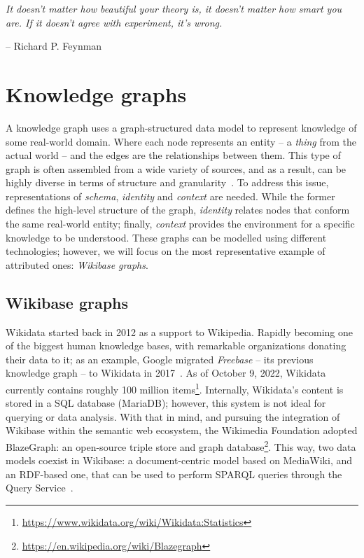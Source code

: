 \epigraph{\textit{It doesn't matter how beautiful your theory is, it doesn't matter how smart you are. If it doesn't agree with experiment, it's wrong.}}{-- \textup{Richard P. Feynman }}

\section{Knowledge graphs}

A knowledge graph uses a graph-structured data model to represent knowledge of some real-world domain. Where each node represents an entity -- a \textit{thing} from the actual world -- and the edges are the relationships between them. This type of graph is often assembled from a wide variety of sources, and as a result, can be highly diverse in terms of structure and granularity~\cite{DBLP:journals/corr/abs-2003-02320}. To address this issue, representations of \textit{schema}, \textit{identity} and \textit{context} are needed. While the former defines the high-level structure of the graph, \textit{identity} relates nodes that conform the same real-world entity; finally, \textit{context} provides the environment for a specific knowledge to be understood. These graphs can be modelled using different technologies; however, we will focus on the most representative example of attributed ones: \textit{Wikibase graphs}.

\subsection{Wikibase graphs}

Wikidata started back in 2012 as a support to Wikipedia. Rapidly becoming one of the biggest human knowledge bases, with remarkable organizations donating their data to it; as an example, Google migrated \textit{Freebase} -- its previous knowledge graph -- to Wikidata in 2017~\cite{10.1145/2872427.2874809}. As of October 9, 2022, Wikidata currently contains roughly 100 million items\footnote{\url{https://www.wikidata.org/wiki/Wikidata:Statistics}}. Internally, Wikidata's content is stored in a SQL database (MariaDB); however, this system is not ideal for querying or data analysis. With that in mind, and pursuing the integration of Wikibase within the semantic web ecosystem, the Wikimedia Foundation adopted BlazeGraph: an open-source triple store and graph database\footnote{\url{https://en.wikipedia.org/wiki/Blazegraph}}. This way, two data models coexist in Wikibase: a document-centric model based on MediaWiki, and an RDF-based one, that can be used to perform SPARQL queries through the Query Service~\cite{https://doi.org/10.48550/arxiv.2110.11709}.


